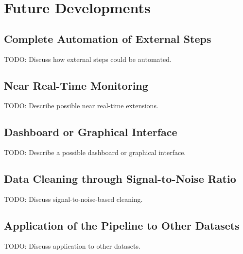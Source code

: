 \chapter{Future Developments}

\section{Complete Automation of External Steps}
TODO: Discuss how external steps could be automated.

\section{Near Real-Time Monitoring}
TODO: Describe possible near real-time extensions.

\section{Dashboard or Graphical Interface}
TODO: Describe a possible dashboard or graphical interface.

\section{Data Cleaning through Signal-to-Noise Ratio}
TODO: Discuss signal-to-noise-based cleaning.

\section{Application of the Pipeline to Other Datasets}
TODO: Discuss application to other datasets.
